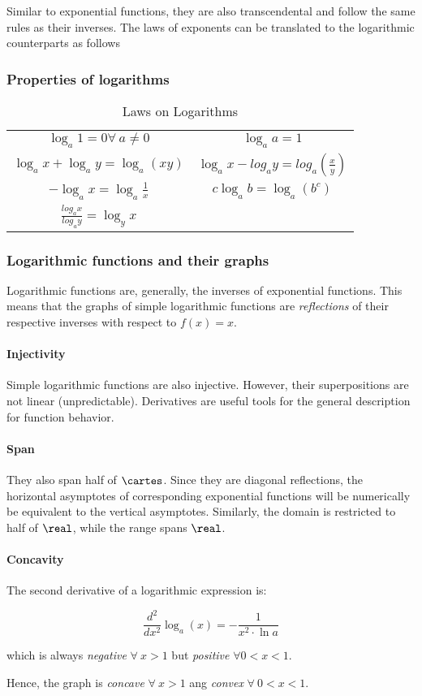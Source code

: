 Similar to exponential functions, they are also transcendental and follow the same rules as their inverses.
The laws of exponents can be translated to the logarithmic counterparts as follows

\subsubsection{Properties of logarithms}

\begin{table}
  \centering
  \caption{Laws on Logarithms}

  \begin{tabular}{c|c}
    $\log_a 1 = 0 \forall\ a \neq 0$ & $\log_a a = 1$ \\
    $\log_a x + \log_a y = \log_a (xy)$ & $\log_a x - log_a y = log_a (\frac{x}{y})$ \\
    $-\log_a x = \log_a \frac{1}{x}$ & $c\log_a b = \log_a (b^c)$ \\
    $\frac{log_a x}{log_a y} = \log_y x$
  \end{tabular}

\end{table}

\subsubsection{Logarithmic functions and their graphs}

Logarithmic functions are, generally, the inverses of exponential functions.
This means that the graphs of simple logarithmic functions are \emph{reflections} of their respective inverses with respect to $f(x) = x$.

\paragraph{Injectivity} Simple logarithmic functions are also injective.
However, their superpositions are not linear (unpredictable).
Derivatives are useful tools for the general description for function behavior.

\paragraph{Span} They also span half of $\cartes$.
Since they are diagonal reflections, the horizontal asymptotes of corresponding exponential functions will be numerically be equivalent to the vertical asymptotes.
Similarly, the domain is restricted to half of $\real$, while the range spans $\real$.

\paragraph{Concavity}
The second derivative of a logarithmic expression is:

$$\frac{d^2}{dx^2} \log_a (x) = -\frac{1}{x^2 \cdot \ln{a}}$$

which is always \emph{negative} $\forall\ x > 1$ but \emph{positive} $\forall 0 < x < 1$.

Hence, the graph is \emph{concave} $\forall\ x > 1$ ang \emph{convex} $\forall\ 0 < x < 1$.
